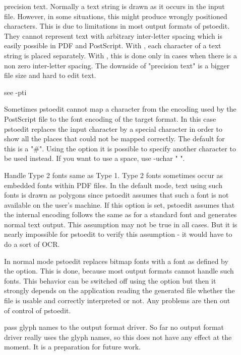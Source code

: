 \documentclass[english,a4paper]{article}
\begin{document}
\begin{description}
\item[]
precision text. Normally a text string is drawn as it occurs in the input file. However, in some situations, this might produce wrongly positioned characters. This is due to limitations in most output formats of pstoedit. They cannot represent text with arbitrary inter-letter spacing which is easily possible in PDF and PostScript. With , each character of a text string is placed separately. With , this is done only in cases when there is a non zero inter-letter spacing. The downside of "precision text" is a bigger file size and hard to edit text.


\item[]
see -pti


\item[]
Sometimes pstoedit cannot map a character from the encoding used by the PostScript file to the font encoding of the target format. In this case pstoedit replaces the input character by a special character in order to show all the places that could not be mapped correctly. The default for this is a "\#". Using the  option it is possible to specify another character to be used instead. If you want to use a space, use -uchar " ".


\item[]
Handle Type 2 fonts same as Type 1. Type 2 fonts sometimes occur as embedded fonts within PDF files. In the default mode, text using such fonts is drawn as polygons since pstoedit assumes that such a font is not available on the user's machine. If this option is set, pstoedit assumes that the internal encoding follows the same as for a standard font and generates normal text output. This assumption may not be true in all cases. But it is nearly impossible for pstoedit to verify this assumption - it would have to do a sort of OCR.


\item[]
In normal mode pstoedit replaces bitmap fonts with a font as defined by the  option. This is done, because most output formats cannot handle such fonts. This behavior can be switched off using the  option but then it strongly depends on the application reading the generated file whether the file is usable and correctly interpreted or not. Any problems are then out of control of pstoedit.


\item[]
pass glyph names to the output format driver. So far no output format driver really uses the glyph names, so this does not have any effect at the moment. It is a preparation for future work.



\end{description}
\end{document}
